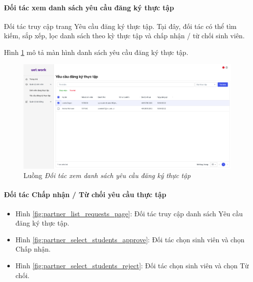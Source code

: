 \documentclass[./../main.tex]{subfiles}
\begin{document}
\paragraph*{Đối tác xem danh sách yêu cầu đăng ký thực tập}

Đối tác truy cập trang Yêu cầu đăng ký thực tập. Tại đây, đối tác có thể tìm kiếm, sắp xếp, lọc danh sách theo kỳ thực tập và chấp nhận / từ chối sinh viên.

Hình \ref{fig:partner_view_list_requests_page} mô tả màn hình danh sách yêu cầu đăng ký thực tập.

\begin{figure}[]
	\includegraphics[width=\linewidth]{./images/image29.png}
	\caption{Luồng \emph{Đối tác xem danh sách yêu cầu đăng ký thực tập}}
	\label{fig:partner_view_list_requests_page}
\end{figure}

\paragraph*{Đối tác Chấp nhận / Từ chối yêu cầu thực tập}

\begin{itemize}
	\item Hình \ref{fig:partner_list_requests_page}: Đối tác truy cập danh sách Yêu cầu đăng ký thực tập.
	\item Hình \ref{fig:partner_select_students_approve}: Đối tác chọn sinh viên và chọn Chấp nhận.
	\item Hình \ref{fig:partner_select_students_reject}: Đối tác chọn sinh viên và chọn Từ chối.
\end{itemize}
\end{document}
